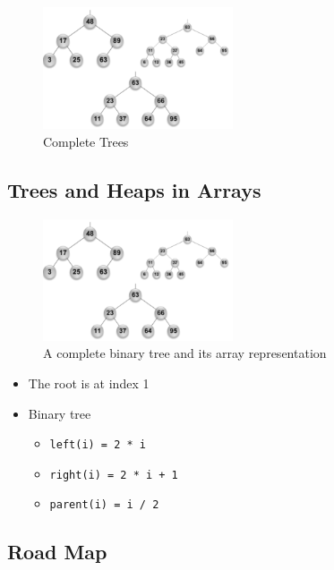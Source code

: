 \documentclass[
  10pt,
  english,
  letterpaper,
,tablecaptionabove
]{scrartcl}
\newcommand{\passthrough}[1]{#1}
\providecommand{\tightlist}{%
  \setlength{\itemsep}{0pt}\setlength{\parskip}{0pt}}
\begin{document}
\begin{figure}
\centering
\includegraphics[width=0.5\textwidth,height=\textheight]{images/6.png}
\caption{Complete Trees}
\end{figure}

\hypertarget{trees-and-heaps-in-arrays}{%
\subsection{Trees and Heaps in Arrays}\label{trees-and-heaps-in-arrays}}

\begin{figure}
\centering
\includegraphics[width=0.5\textwidth,height=\textheight]{images/6.png}
\caption{A complete binary tree and its array representation}
\end{figure}

\begin{itemize}
\tightlist
\item
  The root is at index 1
\item
  Binary tree

  \begin{itemize}
  \tightlist
  \item
    \passthrough{\lstinline!left(i) = 2 * i!}
  \item
    \passthrough{\lstinline!right(i) = 2 * i + 1!}
  \item
    \passthrough{\lstinline!parent(i) = i / 2!}
  \end{itemize}
\end{itemize}

\hypertarget{road-map}{%
\subsection{Road Map}\label{road-map}}
\end{document}
